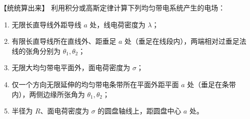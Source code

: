 \begin{origexamplebox}{【统统算出来】}\label{appE:ex:s18-29-1}
利用积分或高斯定律计算下列均匀带电系统产生的电场：
\begin{enumerate}[label=(\arabic*),leftmargin=2.2em]
  \item 无限长直导线外距导线 $a$ 处，线电荷密度为 $\lambda$；
  \item 有限长直导线所在直线外、距垂足 $a$ 处（垂足在线段内），两端相对过垂足法线的张角分别为 $\theta_1,\theta_2$；
  \item 无限大均匀带电平面外，面电荷密度为 $\sigma$；
  \item 仅一个方向无限延伸的均匀带电条带所在平面外距平面 $a$ 处（垂足在条带内），两侧边缘所张角为
  $\theta_1,\theta_2$；
  \item 半径为 $R$、面电荷密度为 $\sigma$ 的圆盘轴线上，距圆盘中心 $a$ 处。
\end{enumerate}
\end{origexamplebox}


